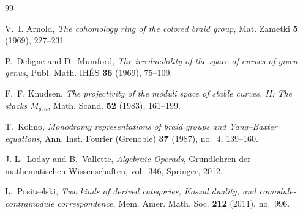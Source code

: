 \documentclass[11pt,reqno]{amsart}
\theoremstyle{definition}
\theoremstyle{remark}
\begin{document}
\begin{thebibliography}{99}

V.~I. Arnold,
\emph{The cohomology ring of the colored braid group},
Mat. Zametki \textbf{5} (1969), 227--231.

P.~Deligne and D.~Mumford,
\emph{The irreducibility of the space of curves of given genus},
Publ. Math. IH\'ES \textbf{36} (1969), 75--109.

F.~F. Knudsen,
\emph{The projectivity of the moduli space of stable curves, II:
The stacks $M_{g,n}$},
Math. Scand. \textbf{52} (1983), 161--199.

T.~Kohno,
\emph{Monodromy representations of braid groups and Yang--Baxter
equations},
Ann. Inst. Fourier (Grenoble) \textbf{37} (1987), no.~4, 139--160.

J.-L.~Loday and B.~Vallette,
\emph{Algebraic Operads},
Grundlehren der mathematischen Wissenschaften, vol.~346,
Springer, 2012.

L.~Positselski,
\emph{Two kinds of derived categories, Koszul duality, and
comodule-contramodule correspondence},
Mem. Amer. Math. Soc. \textbf{212} (2011), no.~996.

\end{thebibliography}
\end{document}
